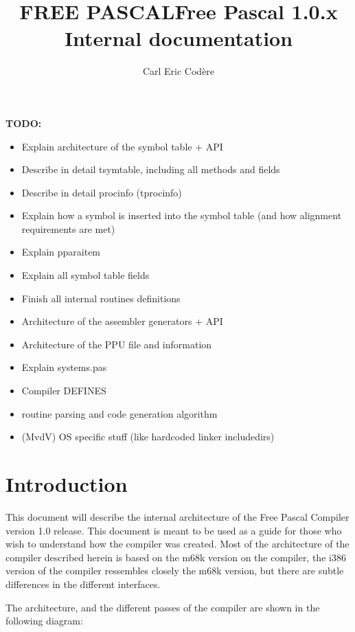 \documentclass [12pt]{article}
\title{FREE PASCAL}
\title{Free Pascal 1.0.x Internal documentation}
\author{Carl Eric Cod\`{e}re}
\begin{document}
\maketitle
\tableofcontents
\newpage
\listoffigures
\newpage 

\textbf{TODO:}
\begin{itemize}
\item Explain architecture of the symbol table + API 
\item Describe in detail tsymtable, including all methods and fields 
\item Describe in detail procinfo (tprocinfo) 
\item Explain how a symbol is inserted into the symbol table (and how alignment requirements are met) 
\item Explain pparaitem 
\item Explain all symbol table fields 
\item Finish all internal routines definitions 
\item Architecture of the assembler generators + API 
\item Architecture of the PPU file and information 
\item Explain systems.pas 
\item Compiler DEFINES 
\item routine parsing and code generation algorithm 
\item (MvdV) OS specific stuff (like hardcoded linker includedirs)
\end{itemize}

\section{Introduction}
\label{sec:introductionappendix}

This document will describe the internal architecture of the Free Pascal 
Compiler version 1.0 release. This document is meant to be used as a guide 
for those who wish to understand how the compiler was created. Most of the 
architecture of the compiler described herein is based on the m68k version 
on the compiler, the i386 version of the compiler ressembles closely the 
m68k version, but there are subtle differences in the different interfaces.

The architecture, and the different passes of the compiler are shown in the 
following diagram:
\end{document}
